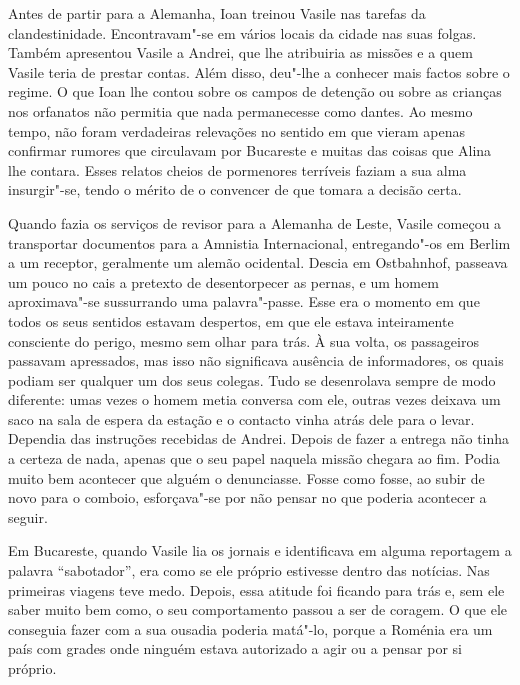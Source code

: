 Antes de partir para a Alemanha, Ioan treinou Vasile nas tarefas da
clandestinidade. Encontravam"-se em vários locais da cidade nas suas
folgas. Também apresentou Vasile a Andrei, que lhe atribuiria as missões
e a quem Vasile teria de prestar contas. Além disso, deu"-lhe a conhecer
mais factos sobre o regime. O que Ioan lhe contou sobre os campos de
detenção ou sobre as crianças nos orfanatos não permitia que nada
permanecesse como dantes. Ao mesmo tempo, não foram verdadeiras
relevações no sentido em que vieram apenas confirmar rumores que
circulavam por Bucareste e muitas das coisas que Alina lhe contara.
Esses relatos cheios de pormenores terríveis faziam a sua alma
insurgir"-se, tendo o mérito de o convencer de que tomara a decisão
certa.

Quando fazia os serviços de revisor para a Alemanha
de Leste, Vasile começou a transportar documentos para a Amnistia
Internacional, entregando"-os em Berlim a um receptor, geralmente um
alemão ocidental. Descia em Ostbahnhof, passeava um pouco no cais a
pretexto de desentorpecer as pernas, e um homem aproximava"-se
sussurrando uma palavra"-passe. Esse era o momento em
que todos os seus sentidos estavam despertos, em que ele estava
inteiramente consciente do perigo, mesmo sem olhar para trás. À sua
volta, os passageiros passavam apressados, mas isso não significava
ausência de informadores, os quais podiam ser qualquer um dos seus
colegas. Tudo se desenrolava sempre de modo diferente: umas vezes o
homem metia conversa com ele, outras vezes deixava um saco na sala de
espera da estação e o contacto vinha atrás dele para o levar. Dependia
das instruções recebidas de Andrei. Depois de fazer a entrega não tinha
a certeza de nada, apenas que o seu papel naquela missão chegara ao fim.
Podia muito bem acontecer que alguém o denunciasse. Fosse como fosse, ao
subir de novo para o comboio, esforçava"-se por não pensar no que poderia
acontecer a seguir.

Em Bucareste, quando Vasile lia os jornais e identificava em alguma reportagem a palavra ``sabotador'', era como se ele próprio
estivesse dentro das notícias. Nas primeiras viagens teve medo. Depois,
essa atitude foi ficando para trás e, sem ele saber muito bem como, o
seu comportamento passou a ser de coragem. O que ele conseguia fazer
com a sua ousadia poderia matá"-lo, porque a Roménia era um país com
grades onde ninguém estava autorizado a agir ou a pensar por si próprio.

